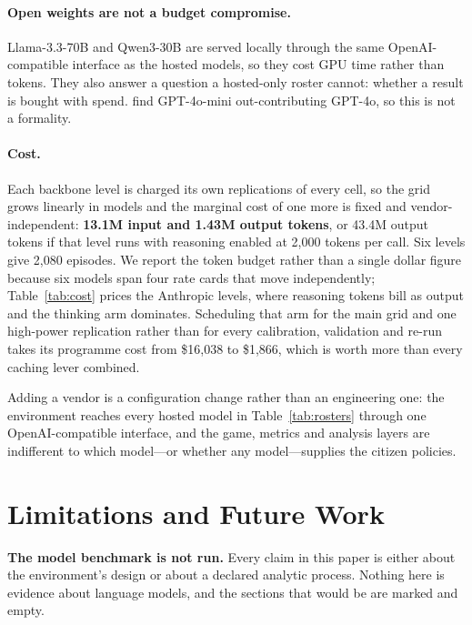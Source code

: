 \documentclass{article}
\begin{document}
\paragraph{Open weights are not a budget compromise.} Llama-3.3-70B and
Qwen3-30B are served locally through the same OpenAI-compatible interface as the
hosted models, so they cost GPU time rather than tokens. They also answer a
question a hosted-only roster cannot: whether a result is bought with spend.
\citet{piedrahita2025sanctsim} find GPT-4o-mini out-contributing GPT-4o, so this
is not a formality.

\paragraph{Cost.} Each backbone level is charged its own replications of every
cell, so the grid grows linearly in models and the marginal cost of one more is
fixed and vendor-independent: \textbf{13.1M input and 1.43M output tokens}, or
43.4M output tokens if that level runs with reasoning enabled at 2{,}000 tokens
per call. Six levels give 2{,}080 episodes. We report the token budget rather
than a single dollar figure because six models span four rate cards that move
independently; Table~\ref{tab:cost} prices the Anthropic levels, where reasoning
tokens bill as output and the thinking arm dominates. Scheduling that arm for
the main grid and one high-power replication rather than for every calibration,
validation and re-run takes its programme cost from \$16{,}038 to \$1{,}866,
which is worth more than every caching lever combined.

Adding a vendor is a configuration change rather than an engineering one: the
environment reaches every hosted model in Table~\ref{tab:rosters} through one
OpenAI-compatible interface, and the game, metrics and analysis layers are
indifferent to which model---or whether any model---supplies the citizen
policies.

\section{Limitations and Future Work}

\textbf{The model benchmark is not run.} Every claim in this paper is either
about the environment's design or about a declared analytic process. Nothing
here is evidence about language models, and the sections that would be are
marked and empty.
\end{document}
